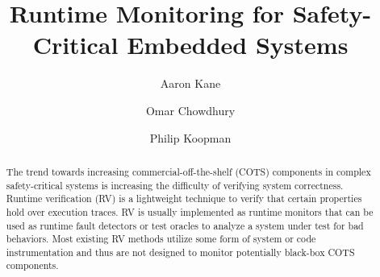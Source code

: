 \documentclass[]{llncs}
\begin{document}
\title{Runtime Monitoring for Safety-Critical Embedded Systems}


\author{Aaron Kane \and Omar Chowdhury \and Philip Koopman}



\maketitle


\begin{abstract}
The trend towards increasing commercial-off-the-shelf (COTS) components in complex safety-critical systems is increasing the difficulty of verifying system correctness. 
Runtime verification (RV) is a lightweight technique to verify that certain properties hold over execution traces.
%
RV is usually implemented as runtime monitors that can be used as runtime fault detectors or test oracles to analyze a system under test for bad behaviors.
%
Most existing RV methods utilize some form of system or code instrumentation and thus are not designed to monitor potentially black-box COTS components.

%
%
\end{abstract}












\end{document}
